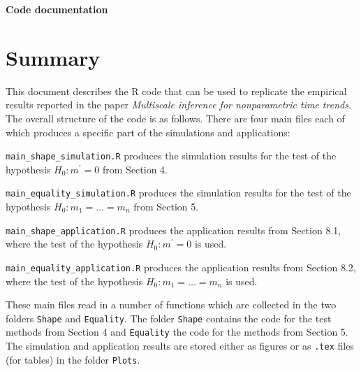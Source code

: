 \documentclass[a4paper,12pt]{article}
\begin{document}
\begin{center}
{\LARGE \bf Code documentation}
\end{center}
\vspace{0.5cm}



\section*{Summary}


\setlength{\parskip}{0.2cm} 
This document describes the R code that can be used to replicate the empirical results reported in the paper \textit{Multiscale inference for nonparametric time trends}. The overall structure of the code is as follows. There are four main files each of which produces a specific part of the simulations and applications:
\vspace{0.2cm}

\everypar{\hangafter=1\hangindent=1.45cm\relax}
\verb|main_shape_simulation.R| \hspace{1pt} produces the simulation results for the test of the hypothesis $H_0: m^\prime = 0$ from Section 4.

\verb|main_equality_simulation.R| \hspace{1pt} produces the simulation results for the test of the hypothesis $H_0: m_1 = \ldots = m_n$ from Section 5.

\verb|main_shape_application.R| \hspace{1pt} produces the application results from Section 8.1, where the test of the hypothesis $H_0: m^\prime = 0$ is used.

\verb|main_equality_application.R| \hspace{1pt} produces the application results from Section 8.2, where the test of the hypothesis $H_0: m_1 = \ldots = m_n$ is used. 
\vspace{0.2cm}

\everypar{\hangafter=0\relax}
These main files read in a number of functions which are collected in the two folders \verb|Shape| and \verb|Equality|. The folder \verb|Shape| contains the code for the test methods from Section 4 and \verb|Equality| the code for the methods from Section 5. The simulation and application results are stored either as figures or as \verb|.tex| files (for tables) in the folder \verb|Plots|. 
\vspace{0.2cm}
\end{document}
